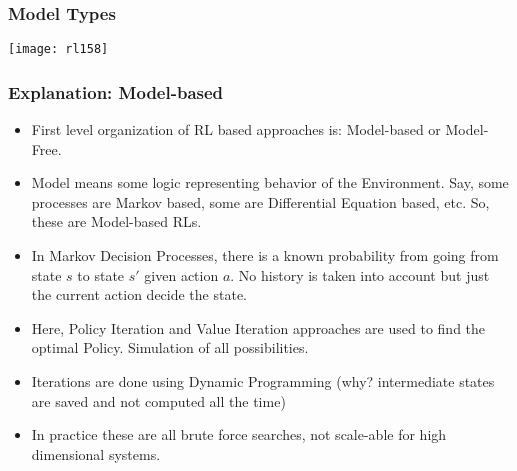 \begin{frame}[fragile]\frametitle{Model Types}

\begin{center}
\texttt{[image: rl158]}
\end{center}

\end{frame}

\begin{frame}[fragile]\frametitle{Explanation: Model-based}

\begin{itemize}
\item First level organization of RL based approaches is: Model-based or Model-Free.
\item Model means some logic representing behavior of the Environment. Say, some processes are Markov based, some are Differential Equation based, etc. So, these are Model-based RLs.
\item In Markov Decision Processes, there is a known probability from going from state $s$ to state $s'$ given action $a$. No history is taken into account but just the current action decide the state. 
\item Here, Policy Iteration and Value Iteration approaches are used to find the optimal Policy. Simulation of all possibilities. 
\item Iterations are done using Dynamic Programming (why? intermediate states are saved and not computed all the time)
\item In practice these are all brute force searches, not scale-able for high dimensional systems.
\end{itemize}

\end{frame}

